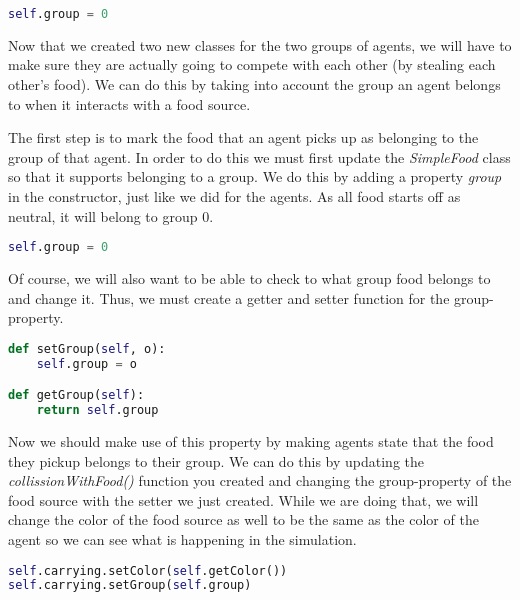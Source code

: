 \begin{lstlisting}[language=Python]
self.group = 0
\end{lstlisting}

Now that we created two new classes for the two groups of agents, we will have to make sure they are actually going to compete with each other (by stealing each other's food). We can do this by taking into account the group an agent belongs to when it interacts with a food source. 

The first step is to mark the food that an agent picks up as belonging to the group of that agent. In order to do this we must first update the \textit{SimpleFood} class so that it supports belonging to a group. We do this by adding a property \textit{group} in the constructor, just like we did for the agents. As all food starts off as neutral, it will belong to group 0. 


\begin{lstlisting}[language=Python]
self.group = 0
\end{lstlisting}

Of course, we will also want to be able to check to what group food belongs to and change it. Thus, we must create a getter and setter function for the group-property.


\begin{lstlisting}[language=Python]
def setGroup(self, o):
	self.group = o

def getGroup(self):
	return self.group
\end{lstlisting}

Now we should make use of this property by making agents state that the food they pickup belongs to their group. We can do this by updating the \textit{collissionWithFood()} function you created and changing the group-property of the food source with the setter we just created. While we are doing that, we will change the color of the food source as well to be the same as the color of the agent so we can see what is happening in the simulation.


\begin{lstlisting}[language=Python]
self.carrying.setColor(self.getColor())
self.carrying.setGroup(self.group)
\end{lstlisting}

